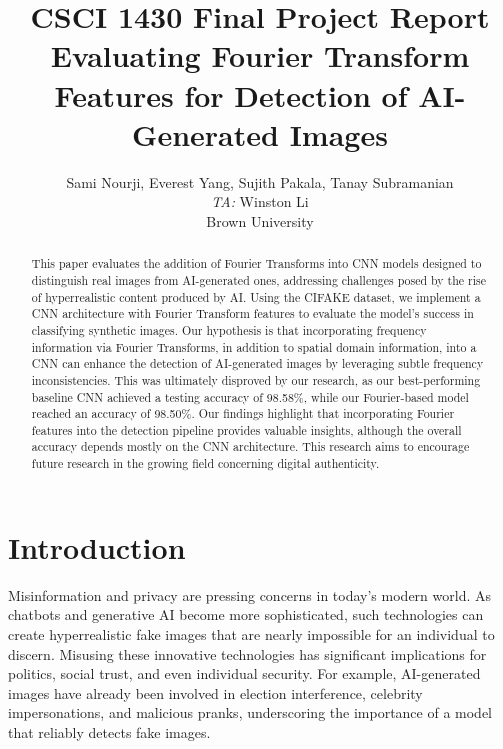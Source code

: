 \title{CSCI 1430 Final Project Report\\Evaluating Fourier Transform Features for Detection of AI-Generated Images}

\author{Sami Nourji, Everest Yang, Sujith Pakala, Tanay Subramanian\\
    \emph{TA:} Winston Li \\
    Brown University\\
}

\maketitle

\begin{abstract}
    This paper evaluates the addition of Fourier Transforms into CNN models designed to distinguish real images from AI-generated ones, addressing challenges posed by the rise of hyperrealistic content produced by AI. Using the CIFAKE dataset, we implement a CNN architecture with Fourier Transform features to evaluate the model’s success in classifying synthetic images. Our hypothesis is that incorporating frequency information via Fourier Transforms, in addition to spatial domain information, into a CNN can enhance the detection of AI-generated images by leveraging subtle frequency inconsistencies. This was ultimately disproved by our research, as our best-performing baseline CNN achieved a testing accuracy of 98.58\%, while our Fourier-based model reached an accuracy of 98.50\%. Our findings highlight that incorporating Fourier features into the detection pipeline provides valuable insights, although the overall accuracy depends mostly on the CNN architecture. This research aims to encourage future research in the growing field concerning digital authenticity.
\end{abstract}

\section{Introduction}

Misinformation and privacy are pressing concerns in today’s modern world. As chatbots and generative AI become more sophisticated, such technologies can create hyperrealistic fake images that are nearly impossible for an individual to discern. Misusing these innovative technologies has significant implications for politics, social trust, and even individual security. For example, AI-generated images have already been involved in election interference, celebrity impersonations, and malicious pranks, underscoring the importance of a model that reliably detects fake images.

